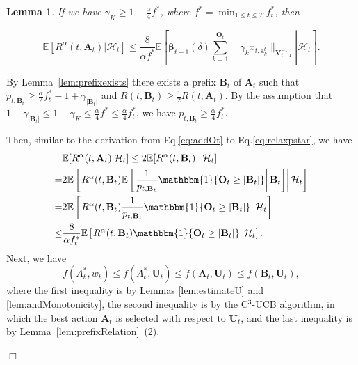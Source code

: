\documentclass{article}
\newcommand{\bbeta}{\boldsymbol{\beta}}
\newcommand{\EE}{\mathbb{E}}
\newcommand{\bOne}{\mathbbm{1}}
\newcommand{\bA}{\mathbf{A}}
\newcommand{\ba}{\mathbf{a}}
\newcommand{\bB}{\mathbf{B}}
\newcommand{\bO}{\mathbf{O}}
\newcommand{\bU}{\mathbf{U}}
\newcommand{\bV}{\mathbf{V}}
\newcommand{\cH}{\mathcal{H}}
\newcommand{\abs}[1]{\left| #1 \right|}
\newcommand{\norm}[1]{\| #1 \|}
\newtheorem{lemma}[theorem]{Lemma}%
\newenvironment{proof}{\noindent {\textbf{Proof. }}}{$\Box$ \medskip}
\newcommand{\CEqDeltaEstAnd}{
	$$
	\EE [R^{\alpha}(t, \bA_t) |\cH_t ] \leq \frac{8}{\alpha f^{\ast}} \EE \left[ \left. \bbeta_{t-1}(\delta)\sum_{k=1}^{\bO_t}\norm{\gamma_k x_{t,\ba_k^t}}_{\bV_{t-1}^{-1}} \right| \cH_t\right].
	$$
}
\begin{document}
\begin{lemma}
	If we have $\gamma_K \geq 1 -  \frac{\alpha}{4} f^{\ast}$, where $f^{\ast} = \min_{1 \leq t \leq T} f_{t}^{\ast}$, then
	\CEqDeltaEstAnd
\end{lemma}
\begin{proof}
	By Lemma~\ref{lem:prefixexists} there exists a prefix $\bB_t$ of $\bA_t$ such that $p_{t, \bB_t} \geq \frac{\alpha}{2}f_{t}^* - 1 + \gamma_{|\bB_t|}$ and $R(t, \bB_t) \geq \frac{1}{2} R(t, \bA_t)$. By the assumption that $1-\gamma_{|\bB_t|} \leq 1-\gamma_K \leq \frac{\alpha}{4} f^{\ast} \leq \frac{\alpha}{4} f^*_{t}  $, we have $p_{t, \bB_t} \geq \frac{\alpha}{4}f_{t}^*$. 
	
	Then, similar to the derivation from Eq.\eqref{eq:addOt} to Eq.\eqref{eq:relaxpstar}, we have
	\begin{align}
		&\EE[R^{\alpha}(t, \bA_t) | \cH_t] \leq 2 \EE[R^{\alpha}(t, \bB_t) \left. \right| \cH_t] \nonumber \\
		=& 2 \EE \left[ \left. R^{\alpha}(t, \bB_t) \EE \left[ \left. \frac{1}{p_{t, \bB_t}} \bOne\{\bO_t\geq\abs{\bB_t}\} \right| \bB_t \right]  \right| \cH_t \right] \nonumber \\
		=& 2\EE \left[ \left. R^{\alpha}(t, \bB_t) \frac{1}{p_{t, \bB_t}} \bOne\{\bO_t\geq\abs{\bB_t}\}  \right| \cH_t \right] \nonumber \\
		\leq &\frac{8}{\alpha f_{t}^{\ast}} \EE \left[ \left. R^{\alpha}(t, \bB_t) \bOne\{\bO_t\geq\abs{\bB_t}\}  \right| \cH_t \right]. \label{eq:btOneotbt}
	\end{align}
	Next, we have
	\begin{equation} \label{eq:andstarbt}
		f(A_t^*, w_t) \leq f(A_t^*,\bU_t) \leq f(\bA_t,\bU_t) \leq f(\bB_t,\bU_t),
	\end{equation}
	where the first inequality is by Lemmas \ref{lem:estimateU} and \ref{lem:andMonotonicity}, the second inequality is by the C$^3$-UCB algorithm, in which the best action $\bA_t$ is selected with respect to $\bU_t$, and the last inequality is by Lemma~\ref{lem:prefixRelation}~(2).
	

\end{proof}
\end{document}
